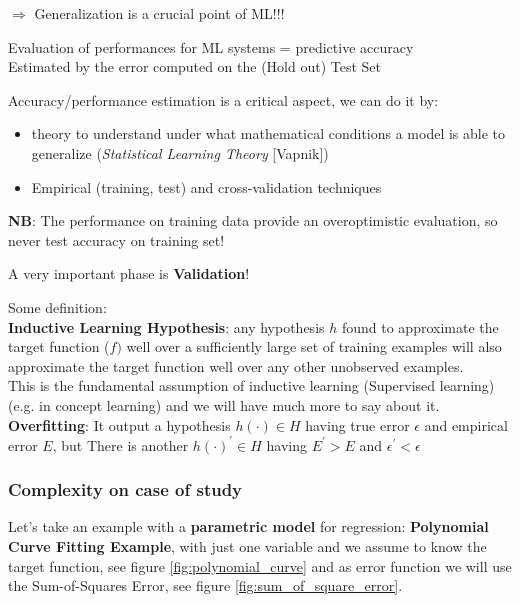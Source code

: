 \documentclass[../main.tex]{subfiles}
\begin{document}
\noindent$\Rightarrow$ Generalization is a crucial point of ML!!!
\begin{center}
    Evaluation of performances for ML systems = predictive accuracy\\
    Estimated by the error computed on the (Hold out) Test Set
\end{center}

\noindent Accuracy/performance estimation is a critical aspect, we can do it by:
\begin{itemize}
    \item theory to understand under what mathematical conditions a model is able to generalize (\textit{Statistical Learning Theory} [Vapnik])
    \item Empirical (training, test) and cross-validation techniques
\end{itemize}

\textbf{NB}: The performance on training data provide an overoptimistic evaluation, so never test accuracy on training set!

\begin{center}
A very important phase is \textbf{Validation}!   
\end{center}


\noindent Some definition:\\

\textbf{Inductive Learning Hypothesis}: any hypothesis $h$ found to
approximate the target function ($f)$ well over a sufficiently large
set of training examples will also approximate the target
function well over any other unobserved examples.\\

This is the fundamental assumption of inductive learning (Supervised learning) (e.g. in concept learning) and we will have much more to say about it.\\

\textbf{Overfitting}: It output a hypothesis $h(\cdot) \in H$ having true error $\epsilon$ and empirical error $E$, but There is another  $h(\cdot)^{'} \in H$ having $E^{'} > E$ and $\epsilon^{'} < \epsilon$

\subsubsection{Complexity on case of study}
Let's take an example with a \textbf{parametric model} for regression: \textbf{Polynomial Curve Fitting Example}, with just one variable and we assume to know the target function, see figure \ref{fig:polynomial_curve} and as error function we will use the Sum-of-Squares Error, see figure \ref{fig:sum_of_square_error}.
\end{document}
